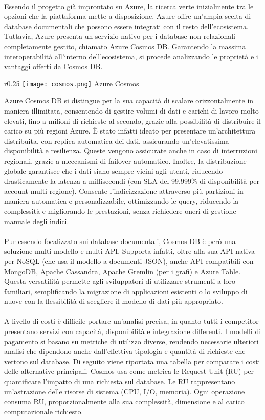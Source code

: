 \\
Essendo il progetto già improntato su Azure,
la ricerca verte inizialmente tra le opzioni che  la piattaforma mette a disposizione.
Azure offre un'ampia scelta di database documentali
che possono essere integrati con il resto dell'ecosistema.
Tuttavia, Azure presenta un servizio nativo per i database non relazionali
completamente gestito, chiamato Azure Cosmos DB.
Garantendo la massima interoperabilità all'interno dell'ecosistema,
si procede analizzando le proprietà e i vantaggi offerti da Cosmos DB.\\
\begin{wrapfigure}{r}{0.25\textwidth}
    \centering
    \texttt{[image: cosmos.png]}
    Azure Cosmos
\end{wrapfigure}
Azure Cosmos DB si distingue per la sua capacità di scalare orizzontalmente in maniera illimitata,
consentendo di gestire volumi di dati e carichi di lavoro molto elevati,
fino a milioni di richieste al secondo,
grazie alla possibilità di distribuire il carico su più regioni Azure.
È stato infatti ideato per presentare un'architettura distribuita,
con replica automatica dei dati,
assicurando un'elevatissima disponibilità e resilienza.
Queste vengono assicurate anche in caso di interruzioni regionali,
grazie a meccanismi di failover automatico.
Inoltre, la distribuzione globale garantisce che i dati siano sempre vicini agli utenti,
riducendo drasticamente la latenza a millisecondi
(con SLA del 99.999\% di disponibilità per account multi-regione).
Consente l'indicizzazione attraverso più partizioni in maniera automatica e personalizzabile, ottimizzando le query, riducendo la complessità e migliorando le prestazioni,
senza richiedere oneri di gestione manuale degli indici.\\
\\
Pur essendo focalizzato sui database documentali,
Cosmos DB è però una soluzione multi-modello e multi-API.
Supporta infatti, oltre alla sua API nativa per NoSQL (che usa il modello a documenti JSON),
anche API compatibili con MongoDB, Apache Cassandra, Apache Gremlin (per i grafi) e Azure Table.
Questa versatilità permette agli sviluppatori di utilizzare strumenti  a loro familiari,
semplificando la migrazione di applicazioni esistenti o
lo sviluppo di nuove con la flessibilità di scegliere il modello di dati più appropriato.\\
\\
A livello di costi è difficile portare un'analisi precisa,
in quanto tutti i competitor presentano servizi
con capacità, disponibilità e integrazione differenti.
I modelli di pagamento si basano su metriche di utilizzo diverse,
rendendo necessarie ulteriori analisi che dipendono anche
dall'effettiva tipologia e quantità di richieste che vertono sul database.
Di seguito viene riportata una tabella per comparare i costi delle alternative principali.
Cosmos usa come metrica le Request Unit (RU)
per quantificare l'impatto di una richiesta sul database.
Le RU rappresentano un'astrazione delle risorse di sistema (CPU, I/O, memoria).
Ogni operazione consuma RU, proporzionalmente alla sua
complessità, dimensione e al carico computazionale richiesto.\\

